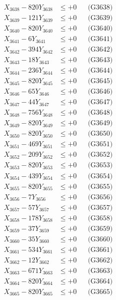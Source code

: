 \documentclass[a4paper,10pt]{article}
\begin{document}
{\begin{align}
X_{3638} - 820Y_{3638} &\leq +0 && \text{(G3638)} \\
X_{3639} - 121Y_{3639} &\leq +0 && \text{(G3639)} \\
X_{3640} - 820Y_{3640} &\leq +0 && \text{(G3640)} \\
\allowbreak
X_{3641} - 6Y_{3641} &\leq +0 && \text{(G3641)} \\
X_{3642} - 394Y_{3642} &\leq +0 && \text{(G3642)} \\
X_{3643} - 18Y_{3643} &\leq +0 && \text{(G3643)} \\
X_{3644} - 236Y_{3644} &\leq +0 && \text{(G3644)} \\
X_{3645} - 820Y_{3645} &\leq +0 && \text{(G3645)} \\
X_{3646} - 65Y_{3646} &\leq +0 && \text{(G3646)} \\
X_{3647} - 44Y_{3647} &\leq +0 && \text{(G3647)} \\
X_{3648} - 756Y_{3648} &\leq +0 && \text{(G3648)} \\
X_{3649} - 820Y_{3649} &\leq +0 && \text{(G3649)} \\
X_{3650} - 820Y_{3650} &\leq +0 && \text{(G3650)} \\
\allowbreak
X_{3651} - 469Y_{3651} &\leq +0 && \text{(G3651)} \\
X_{3652} - 209Y_{3652} &\leq +0 && \text{(G3652)} \\
X_{3653} - 820Y_{3653} &\leq +0 && \text{(G3653)} \\
X_{3654} - 439Y_{3654} &\leq +0 && \text{(G3654)} \\
X_{3655} - 820Y_{3655} &\leq +0 && \text{(G3655)} \\
X_{3656} - 7Y_{3656} &\leq +0 && \text{(G3656)} \\
X_{3657} - 57Y_{3657} &\leq +0 && \text{(G3657)} \\
X_{3658} - 178Y_{3658} &\leq +0 && \text{(G3658)} \\
X_{3659} - 37Y_{3659} &\leq +0 && \text{(G3659)} \\
X_{3660} - 35Y_{3660} &\leq +0 && \text{(G3660)} \\
\allowbreak
X_{3661} - 534Y_{3661} &\leq +0 && \text{(G3661)} \\
X_{3662} - 12Y_{3662} &\leq +0 && \text{(G3662)} \\
X_{3663} - 671Y_{3663} &\leq +0 && \text{(G3663)} \\
X_{3664} - 820Y_{3664} &\leq +0 && \text{(G3664)} \\
X_{3665} - 820Y_{3665} &\leq +0 && \text{(G3665)} \\

\end{align}}
\end{document}
